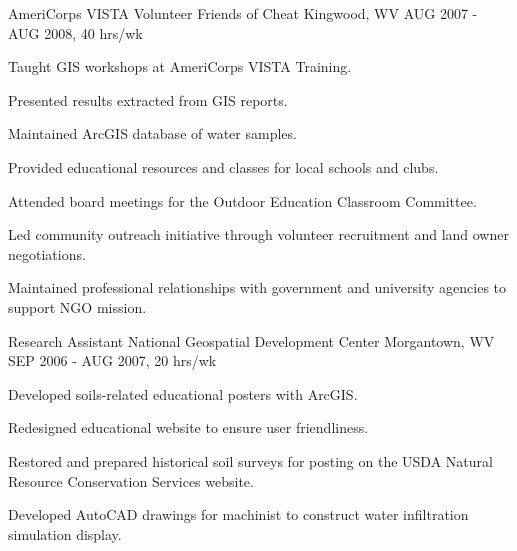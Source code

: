 \begin{cventries}
\cventry
{AmeriCorps VISTA Volunteer} %
{Friends of Cheat} %
{Kingwood, WV} %
{AUG 2007 - AUG 2008, 40 hrs/wk} %
{ %
\begin{cvitems}
\item {Taught GIS workshops at AmeriCorps VISTA Training.}
\item {Presented results extracted from GIS reports.}
\item {Maintained ArcGIS database of water samples.}
\item {Provided educational resources and classes for local schools and clubs.}
\item {Attended board meetings for the Outdoor Education Classroom Committee.}
\item {Led community outreach initiative through volunteer recruitment and land owner negotiations.}
\item {Maintained professional relationships with government and university agencies to support NGO mission.}
\end{cvitems}
}


\cventry
{Research Assistant} %
{National Geospatial Development Center} %
{Morgantown, WV} %
{SEP 2006 - AUG 2007, 20 hrs/wk} %
{ %
\begin{cvitems}
\item {Developed soils-related educational posters with ArcGIS.}
\item {Redesigned educational website to ensure user friendliness.}
\item {Restored and prepared historical soil surveys for posting on the USDA Natural Resource Conservation Services website.}
\item {Developed AutoCAD drawings for machinist to construct water infiltration simulation display.}
\end{cvitems}
}

\vspace{-3mm}
\end{cventries}